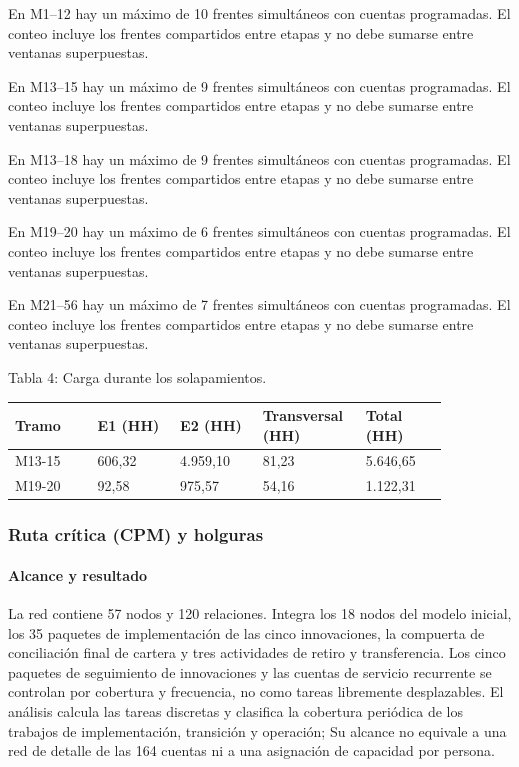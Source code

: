 En M1–12 hay un máximo de 10 frentes simultáneos con cuentas programadas. El conteo incluye los frentes compartidos entre etapas y no debe sumarse entre ventanas superpuestas.

En M13–15 hay un máximo de 9 frentes simultáneos con cuentas programadas. El conteo incluye los frentes compartidos entre etapas y no debe sumarse entre ventanas superpuestas.

En M13–18 hay un máximo de 9 frentes simultáneos con cuentas programadas. El conteo incluye los frentes compartidos entre etapas y no debe sumarse entre ventanas superpuestas.

En M19–20 hay un máximo de 6 frentes simultáneos con cuentas programadas. El conteo incluye los frentes compartidos entre etapas y no debe sumarse entre ventanas superpuestas.

En M21–56 hay un máximo de 7 frentes simultáneos con cuentas programadas. El conteo incluye los frentes compartidos entre etapas y no debe sumarse entre ventanas superpuestas.

Tabla 4: Carga durante los solapamientos.

\begin{longtable}{@{}p{0.171\linewidth}p{0.171\linewidth}p{0.171\linewidth}p{0.171\linewidth}p{0.171\linewidth}@{}}
\toprule
\textbf{Tramo} & \textbf{E1 (HH)} & \textbf{E2 (HH)} & \textbf{Transversal (HH)} & \textbf{Total (HH)} \\
\midrule
\endhead
\bottomrule
\endlastfoot
M13-15 & 606,32 & 4.959,10 & 81,23 & 5.646,65 \\
M19-20 & 92,58 & 975,57 & 54,16 & 1.122,31 \\
\end{longtable}

\subsubsection{Ruta crítica (CPM) y holguras}

\paragraph{Alcance y resultado}

La red contiene 57 nodos y 120 relaciones. Integra los 18 nodos del modelo inicial, los 35 paquetes de implementación de las cinco innovaciones, la compuerta de conciliación final de cartera y tres actividades de retiro y transferencia. Los cinco paquetes de seguimiento de innovaciones y las cuentas de servicio recurrente se controlan por cobertura y frecuencia, no como tareas libremente desplazables. El análisis calcula las tareas discretas y clasifica la cobertura periódica de los trabajos de implementación, transición y operación; Su alcance no equivale a una red de detalle de las 164 cuentas ni a una asignación de capacidad por persona.

